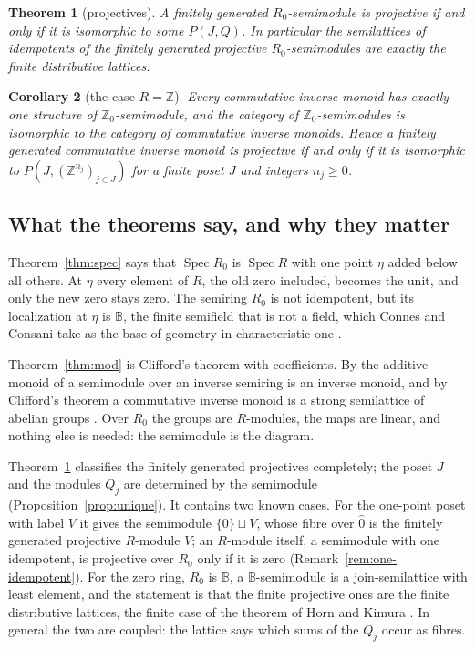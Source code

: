 \documentclass[11pt]{amsart}
\newtheorem{theorem}{Theorem}
\newtheorem{maincor}[theorem]{Corollary}
\theoremstyle{remark}
\newcommand{\B}{\mathbb B}
\newcommand{\oz}{\widehat{0}}
\DeclareMathOperator{\Spec}{Spec}
\begin{document}
\begin{theorem}[projectives]\label{thm:proj}
A finitely generated $R_0$-semimodule is projective if and only if it is isomorphic to some $P(J,Q)$. In particular the semilattices of idempotents of the finitely generated projective $R_0$-semimodules are exactly the finite distributive lattices.
\end{theorem}

\begin{maincor}[the case $R=\mathbb Z$]\label{cor:Z}
Every commutative inverse monoid has exactly one structure of $\mathbb Z_0$-semimodule, and the category of $\mathbb Z_0$-semimodules is isomorphic to the category of commutative inverse monoids. Hence a finitely generated commutative inverse monoid is projective if and only if it is isomorphic to $P(J,(\mathbb Z^{n_j})_{j\in J})$ for a finite poset $J$ and integers $n_j\ge0$.
\end{maincor}

\subsection{What the theorems say, and why they matter}
Theorem~\ref{thm:spec} says that $\Spec R_0$ is $\Spec R$ with one point $\eta$ added below all others. At $\eta$ every element of $R$, the old zero included, becomes the unit, and only the new zero stays zero. The semiring $R_0$ is not idempotent, but its localization at $\eta$ is $\B$, the finite semifield that is not a field, which Connes and Consani take as the base of geometry in characteristic one \cite{CCs,CC}.

Theorem~\ref{thm:mod} is Clifford's theorem with coefficients. By \cite[Proposition 6.1]{FGJM} the additive monoid of a semimodule over an inverse semiring is an inverse monoid, and by Clifford's theorem a commutative inverse monoid is a strong semilattice of abelian groups \cite{Clifford}. Over $R_0$ the groups are $R$-modules, the maps are linear, and nothing else is needed: the semimodule is the diagram.

Theorem~\ref{thm:proj} classifies the finitely generated projectives completely; the poset $J$ and the modules $Q_j$ are determined by the semimodule (Proposition~\ref{prop:unique}). It contains two known cases. For the one-point poset with label $V$ it gives the semimodule $\{0\}\sqcup V$, whose fibre over $\oz$ is the finitely generated projective $R$-module $V$; an $R$-module itself, a semimodule with one idempotent, is projective over $R_0$ only if it is zero (Remark~\ref{rem:one-idempotent}). For the zero ring, $R_0$ is $\B$, a $\B$-semimodule is a join-semilattice with least element, and the statement is that the finite projective ones are the finite distributive lattices, the finite case of the theorem of Horn and Kimura \cite{HK}. In general the two are coupled: the lattice says which sums of the $Q_j$ occur as fibres.
\end{document}
